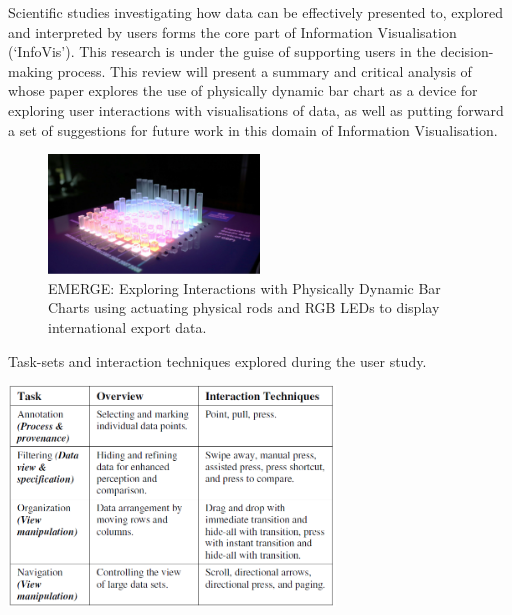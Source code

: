 \documentclass[12pt]{article}
\begin{document}
Scientific studies investigating how data can be effectively presented to, explored and interpreted by users forms the core part of Information Visualisation (`InfoVis'). This research is under the guise of supporting users in the decision-making process. This review will present a summary and critical analysis of \citet{taher2015} whose paper explores the use of physically dynamic bar chart as a device for exploring user interactions with visualisations of data, as well as putting forward a set of suggestions for future work in this domain of Information Visualisation.


\begin{figure}[H]
\centering
\includegraphics[width=0.5\textwidth]{img/taher2015-emerge.png} 
\caption{EMERGE: Exploring Interactions with Physically Dynamic Bar Charts using actuating physical rods and RGB LEDs to display international export data.}\label{fig:taher2015-emerge}
\end{figure}

\begin{table}[H]
\centering
\caption{Task-sets and interaction techniques explored during the user study.}\label{tbl:taher2015-user-study}
\includegraphics[width=0.65\textwidth]{img/taher2015-user-study.png} 
\end{table}

\end{document}
